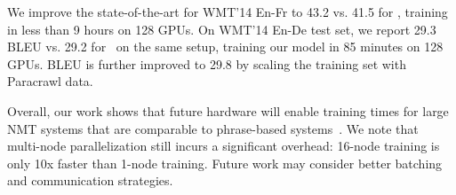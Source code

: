 \documentclass[11pt,a4paper]{article}
\begin{document}
We improve the state-of-the-art for WMT'14 En-Fr to 43.2 vs. 41.5 for \citet{shaw2018relpos}, training in less than 9 hours on 128 GPUs. On WMT'14 En-De test set, we report 29.3 BLEU vs. 29.2 for~\citet{shaw2018relpos} on the same setup, training our model in 85 minutes on 128 GPUs.
BLEU is further improved to 29.8 by scaling the training set with Paracrawl data.

Overall, our work shows that future hardware will enable training times for large NMT systems that are comparable to phrase-based systems~\cite{koehn:moses:2007}. We note that multi-node parallelization still incurs a significant overhead: 16-node training is only 10x faster than 1-node training. Future work may consider better batching and communication strategies.




\end{document}
